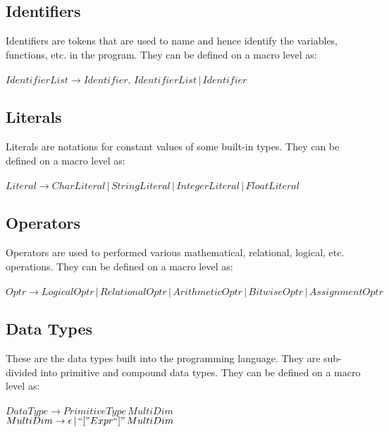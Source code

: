 \documentclass[12pt, a4paper]{article}
\begin{document}
				\subsection{Identifiers}
				Identifiers are tokens that are used to name and hence identify the variables, functions, etc. in the program. 
				They can be defined on a macro level as: \\\\
				$IdentifierList \to Identifier, \,  IdentifierList  \,|\,  Identifier $ \\
				
				
				\subsection{Literals}
				Literals are notations for constant values of some built-in types. They can be defined on a macro level as: \\\\
				$ Literal \to CharLiteral \,|\, StringLiteral \,|\, IntegerLiteral \,|\, FloatLiteral $ \\ 
				
				\subsection{Operators}
				Operators are used to performed various mathematical, relational, logical, etc. operations. They can be defined on a macro level as: \\\\
				$ Optr \to LogicalOptr \,|\, RelationalOptr \,|\,  ArithmeticOptr \,|\, BitwiseOptr \,|\, AssignmentOptr $ \\ 
				
				\subsection{Data Types}
				These are the data types built into the programming language. They are sub-divided into primitive  and compound data types.  They can be defined on a macro level as: \\\\
				$ DataType \to  PrimitiveType \, MultiDim $ \\ 
				$ MultiDim\to \epsilon \,|\, ``["Expr``]" \, MultiDim  $ \\\\
				
\end{document}
